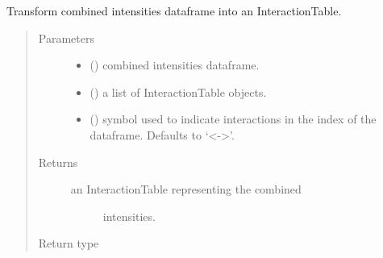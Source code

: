 \documentclass[letterpaper,10pt,english]{sphinxmanual}
\begin{document}
\begin{fulllineitems}
\label{\detokenize{_modules/cosifer.combiners:cosifer.combiners.core.combined_df_to_interaction_table}}
Transform combined intensities dataframe into an InteractionTable.
\begin{quote}\begin{description}
\item[{Parameters}] \leavevmode\begin{itemize}
\item {} 
 () \textendash{} combined intensities dataframe.

\item {} 
 () \textendash{} a list of InteractionTable objects.

\item {} 
 (\sphinxstyleliteralemphasis{\sphinxupquote{, }}) \textendash{} symbol used to indicate
interactions in the index of the dataframe. Defaults to ‘\textless{}-\textgreater{}’.

\end{itemize}

\item[{Returns}] \leavevmode
\begin{description}
\item[{an InteractionTable representing the combined}] \leavevmode
intensities.

\end{description}


\item[{Return type}] \leavevmode
{\hyperref[\detokenize{_modules/cosifer.collections:cosifer.collections.interaction_table.InteractionTable}]{}}

\end{description}\end{quote}

\end{fulllineitems}
\end{document}
